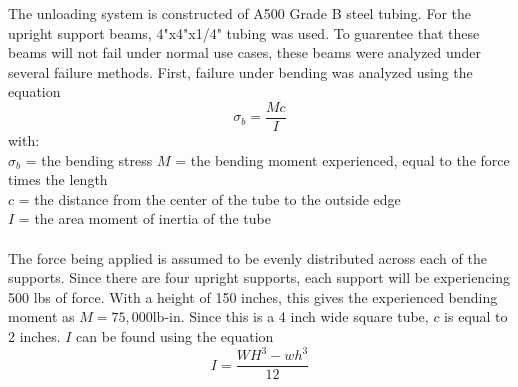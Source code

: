 \documentclass[10pt]{project}
\begin{document}
The unloading system is constructed of A500 Grade B steel tubing.  For the upright support beams, 4"x4"x1/4" tubing was used.  To guarentee that these beams will not fail under normal use cases, these beams were analyzed under several failure methods.  First, failure under bending was analyzed using the equation $$\sigma_b = \frac{Mc}{I}$$
with:\\
$\sigma_b$ = the bending stress
$M$ = the bending moment experienced, equal to the force times the length\\
$c$ = the distance from the center of the tube to the outside edge\\
$I$ = the area moment of inertia of the tube\\\\
The force being applied is assumed to be evenly distributed across each of the supports.  Since there are four upright supports, each support will be experiencing 500 lbs of force.  With a height of 150 inches, this gives the experienced bending moment as $M = 75,000$lb-in.  Since this is a 4 inch wide square tube, $c$ is equal to 2 inches.  $I$ can be found using the equation $$I = \frac{WH^3-wh^3}{12}$$
\end{document}
